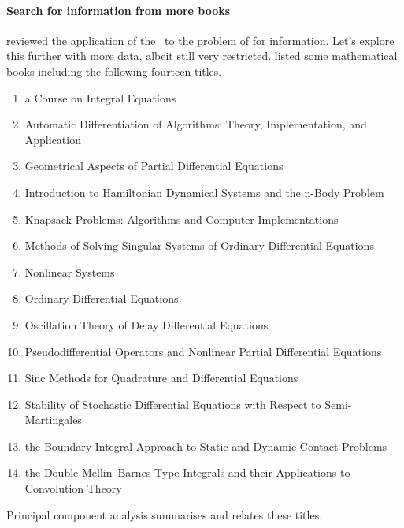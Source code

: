 \paragraph{Search for information from more books}
\cite{Berry95} reviewed the application of the \svd\ to the problem of  for information.
Let's explore this further with more data, albeit still very restricted.
\cite{Berry95} listed some mathematical books including the following fourteen titles.
\begin{enumerate}
\item a Course on Integral Equations
\item Automatic Differentiation of Algorithms: Theory, Implementation, and Application
\item Geometrical Aspects of Partial Differential Equations
\item Introduction to Hamiltonian Dynamical Systems and the n-Body Problem
\item Knapsack Problems: Algorithms and Computer Implementations 
\item Methods of Solving Singular Systems of Ordinary Differential Equations
\item Nonlinear Systems
\item Ordinary Differential Equations
\item Oscillation Theory of Delay Differential Equations 
\item Pseudodifferential Operators and Nonlinear Partial Differential Equations
\item Sinc Methods for Quadrature and Differential Equations 
\item Stability of Stochastic Differential Equations with Respect to Semi-Martingales
\item the Boundary Integral Approach to Static and Dynamic Contact Problems
\item the Double Mellin--Barnes Type Integrals and their Applications to Convolution Theory
\end{enumerate}
Principal component analysis summarises and relates these titles.
